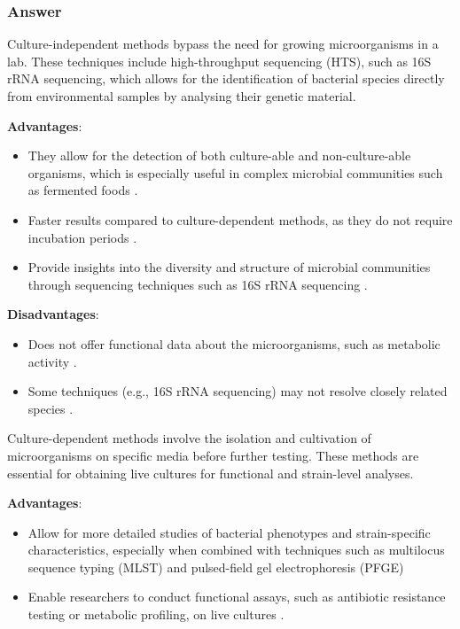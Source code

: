 \subsubsection*{Answer}
Culture-independent methods bypass the need for growing microorganisms in a lab. These techniques include high-throughput sequencing (HTS), such as 16S rRNA sequencing, which allows for the identification of bacterial species directly from environmental samples by analysing their genetic material.

\textbf{Advantages}:
\begin{itemize}
    \item They allow for the detection of both culture-able and non-culture-able organisms, which is especially useful in complex microbial communities such as fermented foods \cite*{L3-SeqBasedClass,L5-HighThroughput}.
    \item Faster results compared to culture-dependent methods, as they do not require incubation periods \cite*{L5-DNAEnrichment}.
    \item Provide insights into the diversity and structure of microbial communities through sequencing techniques such as 16S rRNA sequencing \cite*{L3-SeqBasedClass}.
\end{itemize}

\textbf{Disadvantages}:
\begin{itemize}
    \item Does not offer functional data about the microorganisms, such as metabolic activity \cite*{L5-HighThroughput,L3-SeqBasedClass}.
    \item Some techniques (e.g., 16S rRNA sequencing) may not resolve closely related species \cite*{L5-HighThroughput}.
\end{itemize}

Culture-dependent methods involve the isolation and cultivation of microorganisms on specific media before further testing. These methods are essential for obtaining live cultures for functional and strain-level analyses.

\textbf{Advantages}:
\begin{itemize}
    \item Allow for more detailed studies of bacterial phenotypes and strain-specific characteristics, especially when combined with techniques such as multilocus sequence typing (MLST) and pulsed-field gel electrophoresis (PFGE) \cite*{L5-DNAEnrichment}
    \item Enable researchers to conduct functional assays, such as antibiotic resistance testing or metabolic profiling, on live cultures \cite*{L3-SeqBasedClass}.
\end{itemize}


